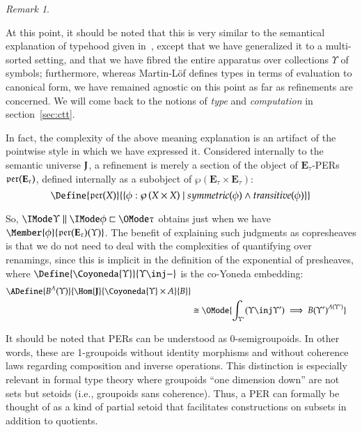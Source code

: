 \documentclass[11pt]{article}
\theoremstyle{definition}
\theoremstyle{notation}
\theoremstyle{remark}
\newtheorem{remark}[thm]{Remark}
\numberwithin{equation}{section}
\newcommand\Pow[1]{\wp\left(#1\right)}
\newcommand\Exprs{\mathbf{E}}
\begin{document}
\begin{remark}\label{rem:internal}

  At this point, it should be noted that this is very similar to the semantical
  explanation of typehood given in~\cite{martin-lof:1979}, except that we have
  generalized it to a multi-sorted setting, and that we have fibred the entire
  apparatus over collections $\Upsilon$ of symbols; furthermore, whereas
  Martin-L\"of defines types in terms of evaluation to canonical form, we have
  remained agnostic on this point as far as refinements are concerned. We will
  come back to the notions of \emph{type} and \emph{computation} in
  section~\ref{sec:ctt}.

  In fact, the complexity of the above meaning explanation is an artifact of
  the pointwise style in which we have expressed it. Considered internally to
  the semantic universe $\mathbf{J}$, a refinement is merely a section of the
  object of $\Exprs_\tau$-PERs $\PERs{\Exprs_\tau}$, defined
  internally as a subobject of $\Pow{\Exprs_\tau\times\Exprs_\tau}$:
  \[
    \Define{
      \PERs{X}
    }{
      \{ \phi : \Pow{X\times X}
         \mid
         symmetric(\phi)
         \land transitive(\phi)
      \}
    }
  \]

  So, $\Refines{\Upsilon}{\phi}{\tau}$ obtains just when we have
  $\Member{\phi}{\PERs{\Exprs_\tau}(\Upsilon)}$. The benefit of explaining such
  judgments as copresheaves is that we do not need to deal with
  the complexities of quantifying over renamings, since this is implicit in the
  definition of the exponential of presheaves, where
  $\Define{\Coyoneda{\Upsilon}}{\Upsilon\inj-}$ is the co-Yoneda embedding:
  \begin{align*}
    \ADefine{
      B^A(\Upsilon)
    }{
      \Hom{\SemU}{
        \Coyoneda{\Upsilon}\times A
      }{
        B
      }
    }\\
    &\cong
    \OMode{
      \int_{\Upsilon'}
      (\Upsilon\inj\Upsilon')
      \implies
      {B(\Upsilon')}^{A(\Upsilon')}
    }
  \end{align*}

  It should be noted that PERs can be understood as 0-semigroupoids. In other
  words, these are 1-groupoids without identity morphisms and without coherence
  laws regarding composition and inverse operations. This distinction is
  especially relevant in formal type theory where groupoids ``one dimension
  down'' are not sets but setoids (i.e., groupoids sans coherence). Thus, a PER
  can formally be thought of as a kind of partial setoid that facilitates
  constructions on subsets in addition to quotients. 

\end{remark}
\end{document}

